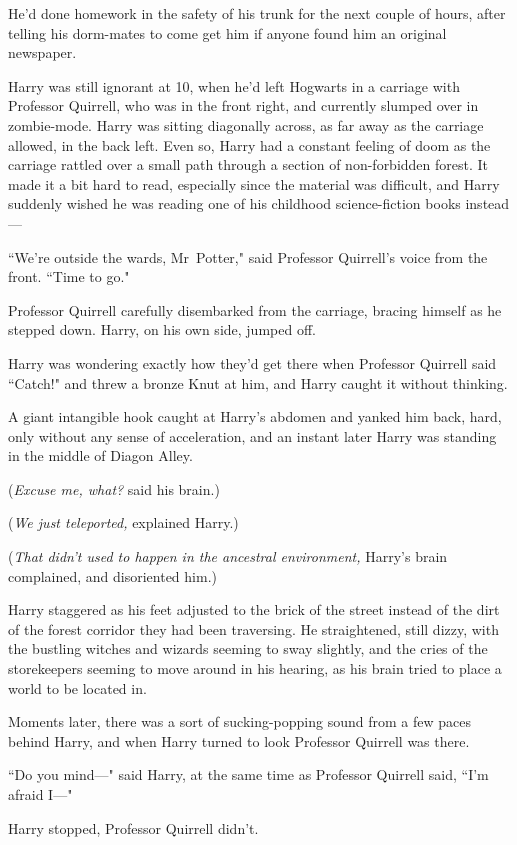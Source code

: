 He'd done homework in the safety of his trunk for the next couple of hours, after telling his dorm-mates to come get him if anyone found him an original newspaper.

Harry was still ignorant at 10\am, when he'd left Hogwarts in a carriage with Professor Quirrell, who was in the front right, and currently slumped over in zombie-mode. Harry was sitting diagonally across, as far away as the carriage allowed, in the back left. Even so, Harry had a constant feeling of doom as the carriage rattled over a small path through a section of non-forbidden forest. It made it a bit hard to read, especially since the material was difficult, and Harry suddenly wished he was reading one of his childhood science-fiction books instead—

``We're outside the wards, Mr~Potter," said Professor Quirrell's voice from the front. ``Time to go."

Professor Quirrell carefully disembarked from the carriage, bracing himself as he stepped down. Harry, on his own side, jumped off.

Harry was wondering exactly how they'd get there when Professor Quirrell said ``Catch!" and threw a bronze Knut at him, and Harry caught it without thinking.

A giant intangible hook caught at Harry's abdomen and yanked him back, hard, only without any sense of acceleration, and an instant later Harry was standing in the middle of Diagon Alley.

(\emph{Excuse me, what?} said his brain.)

(\emph{We just teleported,} explained Harry.)

(\emph{That didn't used to happen in the ancestral environment,} Harry's brain complained, and disoriented him.)

Harry staggered as his feet adjusted to the brick of the street instead of the dirt of the forest corridor they had been traversing. He straightened, still dizzy, with the bustling witches and wizards seeming to sway slightly, and the cries of the storekeepers seeming to move around in his hearing, as his brain tried to place a world to be located in.

Moments later, there was a sort of sucking-popping sound from a few paces behind Harry, and when Harry turned to look Professor Quirrell was there.

``Do you mind—" said Harry, at the same time as Professor Quirrell said, ``I'm afraid I—"

Harry stopped, Professor Quirrell didn't.

